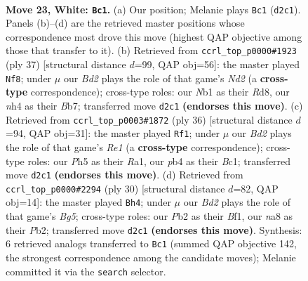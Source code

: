 \documentclass[11pt]{article}
\begin{document}
\clearpage

\begin{figure}[p]\centering
\begin{subfigure}{0.46\textwidth}\centering
\resizebox{\linewidth}{!}{%
\newchessgame
\chessboard[
  setfen={nrbr2k1/p3qpb1/7p/2p1p2P/1p5n/3PPB2/PPQB1P2/RN2NRK1 w - - 2 23},
  showmover=false,
  pgfstyle=straightmove, color=movearrow, markmove={d2-c1}
]}
\caption{}
\end{subfigure}\hfill
\begin{subfigure}{0.46\textwidth}\centering
\resizebox{\linewidth}{!}{%
\newchessgame
\chessboard[
  setfen={3r2k1/1bqnrppp/1p2p3/p7/PbPP4/5N1P/1B2RPP1/1BRQ2K1 b - - 5 19},
  showmover=false,
  pgfstyle=straightmove, color=movearrow, markmove={d7-f8}
]}
\caption{}
\end{subfigure}
\\[4pt]
\begin{subfigure}{0.46\textwidth}\centering
\resizebox{\linewidth}{!}{%
\newchessgame
\chessboard[
  setfen={r1bqr3/pppn1pk1/3p2pp/P2P4/3P3b/3B4/1P2NPPP/R1BQR1K1 w - - 3 19},
  showmover=false,
  pgfstyle=straightmove, color=movearrow, markmove={e1-f1}
]}
\caption{}
\end{subfigure}\hfill
\begin{subfigure}{0.46\textwidth}\centering
\resizebox{\linewidth}{!}{%
\newchessgame
\chessboard[
  setfen={1rb1kb1r/5ppp/pq1pp3/6BP/1n2PPn1/1NN5/1PPQ2P1/1K1R1B1R w k - 1 16},
  showmover=false,
  pgfstyle=straightmove, color=movearrow, markmove={g5-h4}
]}
\caption{}
\end{subfigure}
\caption{\textbf{Move 23, White: \texttt{Bc1}.} (a) Our position; Melanie plays \texttt{Bc1} (\texttt{d2c1}). Panels (b)--(d) are the retrieved master positions whose correspondence most drove this move (highest QAP objective among those that transfer to it). (b) Retrieved from \texttt{ccrl\_top\_p0000\#1923} (ply 37) [structural distance $d$=99, QAP obj=56]: the master played \texttt{Nf8}; under $\mu$ our \emph{Bd2} plays the role of that game's \emph{Nd2} (a \textbf{cross-type} correspondence); cross-type roles: our \emph{N}b1 as their \emph{R}d8, our \emph{n}h4 as their \emph{B}b7; transferred move \texttt{d2c1} \textbf{(endorses this move)}. (c) Retrieved from \texttt{ccrl\_top\_p0003\#1872} (ply 36) [structural distance $d$=94, QAP obj=31]: the master played \texttt{Rf1}; under $\mu$ our \emph{Bd2} plays the role of that game's \emph{Re1} (a \textbf{cross-type} correspondence); cross-type roles: our \emph{P}h5 as their \emph{R}a1, our \emph{p}b4 as their \emph{B}c1; transferred move \texttt{d2c1} \textbf{(endorses this move)}. (d) Retrieved from \texttt{ccrl\_top\_p0000\#2294} (ply 30) [structural distance $d$=82, QAP obj=14]: the master played \texttt{Bh4}; under $\mu$ our \emph{Bd2} plays the role of that game's \emph{Bg5}; cross-type roles: our \emph{P}b2 as their \emph{B}f1, our \emph{n}a8 as their \emph{P}b2; transferred move \texttt{d2c1} \textbf{(endorses this move)}. Synthesis: 6 retrieved analogs transferred to \texttt{Bc1} (summed QAP objective 142, the strongest correspondence among the candidate moves); Melanie committed it via the \texttt{search} selector.}
\label{fig:thought-m44}
\end{figure}
\end{document}
